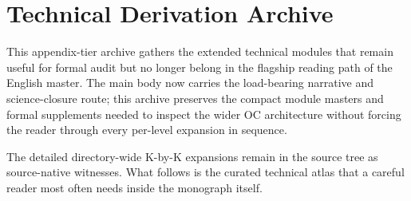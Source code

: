 \section{Technical Derivation Archive}
\label{sec:oc-core-1-3-technical-derivation-archive}

This appendix-tier archive gathers the extended technical modules that remain
useful for formal audit but no longer belong in the flagship reading path of
the English master. The main body now carries the load-bearing narrative and
science-closure route; this archive preserves the compact module masters and
formal supplements needed to inspect the wider OC architecture without forcing
the reader through every per-level expansion in sequence.

The detailed directory-wide K-by-K expansions remain in the source tree as
source-native witnesses. What follows is the curated technical atlas that a
careful reader most often needs inside the monograph itself.

\begingroup
\let\ocappendixsection\section
\let\ocappendixsubsection\subsection
\let\ocappendixsubsubsection\subsubsection
\renewcommand{\section}{\ocappendixsubsection}
\renewcommand{\subsection}{\ocappendixsubsubsection}

\endgroup
